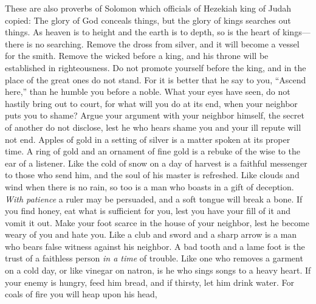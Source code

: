 \begin{biblechapter} %
 These are also proverbs of Solomon which officials of Hezekiah king of Judah copied:
\verse The glory of God conceals things, 
but the glory of kings searches out things.
\verse As heaven is to height and the earth is to depth, 
so is the heart of kings—there is no searching.
\verse Remove the dross from silver, 
and it will become a vessel for the smith.
\verse Remove the wicked before a king, 
and his throne will be established in righteousness.
\verse Do not promote yourself before the king, 
and in the place of the great ones do not stand.
\verse For it is better that he say to you, “Ascend here,” 
than he humble you before a noble. 
What your eyes have seen,
\verse do not hastily bring out to court, 
for what will you do at its end, 
when your neighbor puts you to shame?
\verse Argue your argument with your neighbor himself, 
the secret of another do not disclose,
\verse lest he who hears shame you 
and your ill repute will not end.
\verse Apples of gold in a setting of silver 
is a matter spoken at its proper time.
\verse A ring of gold and an ornament of fine gold 
is a rebuke of the wise to the ear of a listener.
\verse Like the cold of snow on a day of harvest 
is a faithful messenger to those who send him, 
and the soul of his master is refreshed.
\verse Like clouds and wind when there is no rain, 
so too is a man who boasts in a gift of deception.
\verse \textit{With patience} a ruler may be persuaded, 
and a soft tongue will break a bone.
\verse If you find honey, eat what is sufficient for you, 
lest you have your fill of it and vomit it out.
\verse Make your foot scarce in the house of your neighbor, 
lest he become weary of you and hate you.
\verse Like a club and sword and a sharp arrow 
is a man who bears false witness against his neighbor.
\verse A bad tooth and a lame foot 
is the trust of a faithless person \textit{in a time} of trouble.
\verse Like one who removes a garment on a cold day, or like vinegar on natron, 
is he who sings songs to a heavy heart.
\verse If your enemy is hungry, feed him bread, 
and if thirsty, let him drink water.
\verse For coals of fire you will heap upon his head, 

\end{biblechapter}
